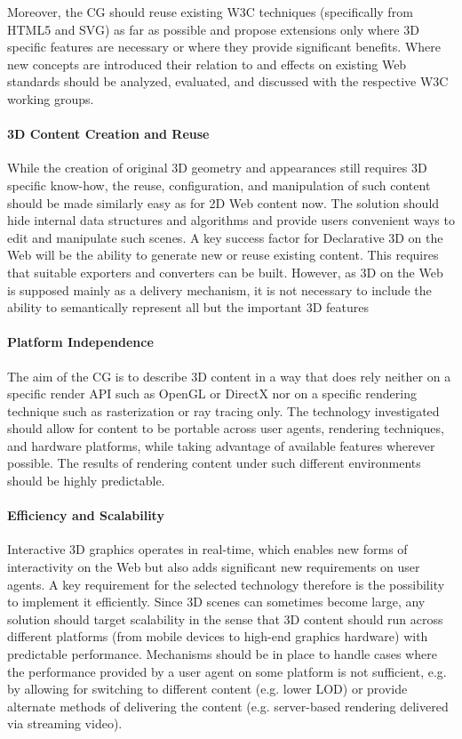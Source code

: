 \documentclass[review]{acmsiggraph}
\begin{document}
Moreover, the CG should reuse existing W3C techniques (specifically from HTML5 and SVG) as far as possible and propose extensions only where 3D specific features are necessary or where they provide significant benefits. Where new concepts are introduced their relation to and effects on existing Web standards should be analyzed, evaluated, and discussed with the respective W3C working groups.

\paragraph{3D Content Creation and Reuse}
While the creation of original 3D geometry and appearances still requires 3D specific know-how, the reuse, configuration, and manipulation of such content should be made similarly easy as for 2D Web content now. The solution should hide internal data structures and algorithms and provide users convenient ways to edit and manipulate such scenes.
A key success factor for Declarative 3D on the Web will be the ability to generate new or reuse existing content. This requires that suitable exporters and converters can be built. However, as 3D on the Web is supposed mainly as a delivery mechanism, it is not necessary to include the ability to semantically represent all but the important 3D features

\paragraph{Platform Independence}
The aim of the CG is to describe 3D content in a way that does rely neither on a specific render API such as OpenGL or DirectX nor on a specific rendering technique such as rasterization or ray tracing only. The technology investigated should allow for content to be portable across user agents, rendering techniques, and hardware platforms, while taking advantage of available features wherever possible. The results of rendering content under such different environments should be highly predictable.

\paragraph{Efficiency and Scalability}
Interactive 3D graphics operates in real-time, which enables new forms of interactivity on the Web but also adds significant new requirements on user agents.  A key requirement for the selected technology therefore is the possibility to implement it efficiently. Since 3D scenes can sometimes become large, any solution should target scalability in the sense that 3D content should run across different platforms (from mobile devices to high-end graphics hardware) with predictable performance. Mechanisms should be in place to handle cases where the performance provided by a user agent on some platform is not sufficient, e.g. by allowing for switching to different content (e.g. lower LOD) or provide alternate methods of delivering the content (e.g. server-based rendering delivered via streaming video).
\end{document}

